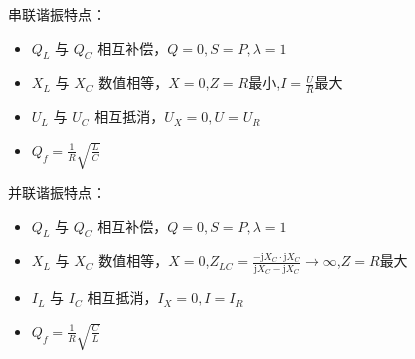 \noindent 串联谐振特点：
\begin{itemize}
    \item $Q_L$ 与 $Q_C$ 相互补偿，$Q=0,S=P,\lambda =1$
    \item $X_L$ 与 $X_C$ 数值相等，$X=0$,$Z=R$最小,$I=\frac{U}{R}$最大
    \item $U_L$ 与 $U_C$ 相互抵消，$U_X=0,U=U_R$
    \item $Q_f=\frac{1}{R}\sqrt{\frac{L}{C}}$
\end{itemize}

\noindent 并联谐振特点：
\begin{itemize}
    \item $Q_L$ 与 $Q_C$ 相互补偿，$Q=0,S=P,\lambda =1$
    \item $X_L$ 与 $X_C$ 数值相等，$X=0$,$Z_{LC}=\frac{-\text{j}X_C\cdot \text{j}X_C}{\text{j}X_C- \text{j}X_C}\rightarrow \infty$,$Z=R$最大
    \item $I_L$ 与 $I_C$ 相互抵消，$I_X=0,I=I_R$
    \item $Q_f=\frac{1}{R}\sqrt{\frac{C}{L}}$
\end{itemize}
